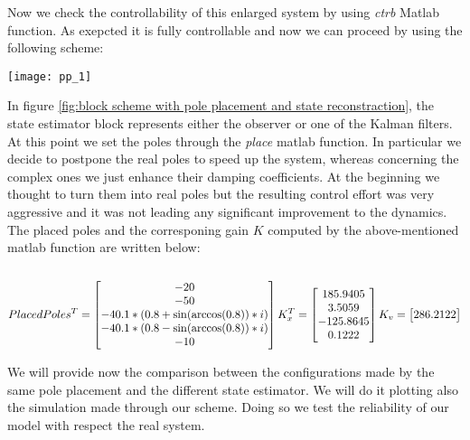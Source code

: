Now we check the controllability of this enlarged system by using \textit{ctrb} Matlab function.
As exepcted it is fully controllable and now we can proceed by using the following scheme:
\begin{figure*}[h]
	\centering
	\texttt{[image: pp\_1]}
	\caption{block scheme with pole placement and state reconstraction}
	\label{fig:block scheme with pole placement and state reconstraction}
\end{figure*}


In figure \ref{fig:block scheme with pole placement and state reconstraction}, the state estimator block represents either the observer or one of the Kalman filters. 
At this point we set the poles through the \textit{place} matlab function. In particular we decide to postpone the real poles to speed up the system, whereas concerning the complex ones we just enhance their damping coefficients. At the beginning we thought to turn them into real poles but the resulting control effort was very aggressive and it was not leading any significant improvement to the dynamics. The placed poles and the corresponing gain $K$ computed by the above-mentioned matlab function are written below:
\\\\

\begin{equation}
	PlacedPoles^{T} =
	\begin{bmatrix}
		-20 \\ -50 \\ -40.1*(0.8+\sin(\arccos(0.8))*i) \\ -40.1*(0.8-\sin(\arccos(0.8))*i) \\-10  
	\end{bmatrix}
	K_x^{T} =
	\begin{bmatrix}
		185.9405 \\  3.5059 \\ -125.8645 \\   0.1222
	\end{bmatrix}
	\\
	K_v =
	\begin{bmatrix}
		286.2122
	\end{bmatrix}
\end{equation}

We will provide now the comparison between the configurations made by the same pole placement and the different state estimator. We will do it plotting also the simulation made through our scheme. Doing so we test the reliability of our model with respect the real system.

